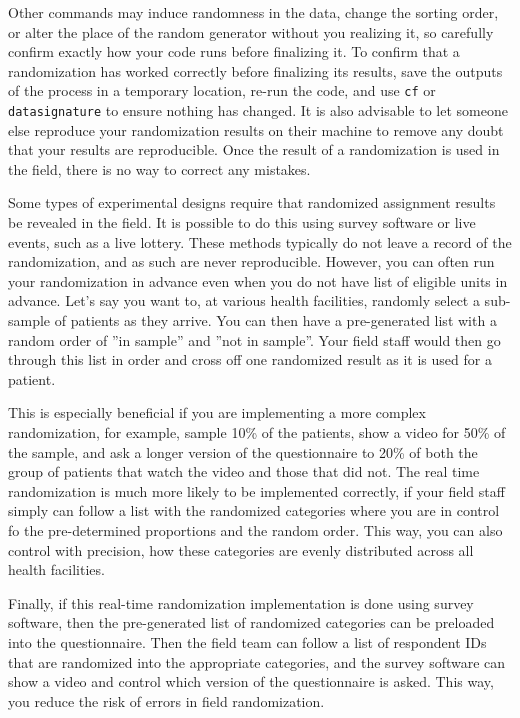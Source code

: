 Other commands may induce randomness in the data,
change the sorting order,
or alter the place of the random generator without you realizing it,
so carefully confirm exactly how your code runs before finalizing it.
To confirm that a randomization has worked correctly before finalizing its results,
save the outputs of the process in a temporary location,
re-run the code, and use \texttt{cf} or \texttt{datasignature} to ensure
nothing has changed. It is also advisable to let someone else reproduce your
randomization results on their machine to remove any doubt that your results
are reproducible.
Once the result of a randomization is used in the field,
there is no way to correct any mistakes.


Some types of experimental designs require
that randomized assignment results be revealed in the field.
It is possible to do this using survey software or live events, such as a live lottery.
These methods typically do not leave a record of the randomization,
and as such are never reproducible.
However, you can often run your randomization in advance
even when you do not have list of eligible units in advance.
Let's say you want to, at various health facilities,
randomly select a sub-sample of patients as they arrive.
You can then have a pre-generated list
with a random order of ''in sample'' and ''not in sample''.
Your field staff would then go through this list in order
and cross off one randomized result as it is used for a patient.

This is especially beneficial if you are implementing a more complex randomization,
for example, sample 10\% of the patients, show a video for 50\% of the sample,
and ask a longer version of the questionnaire to 20\% of both
the group of patients that watch the video and those that did not.
The real time randomization is much more likely to be implemented correctly,
if your field staff simply can follow a list with the randomized categories
where you are in control fo the pre-determined proportions and the random order.
This way, you can also control with precision,
how these categories are evenly distributed across all health facilities.

Finally, if this real-time randomization implementation is done using survey software,
then the pre-generated list of randomized categories can be preloaded
into the questionnaire.
Then the field team can follow a list of respondent IDs
that are randomized into the appropriate categories,
and the survey software can show a video and control which version of the questionnaire is asked.
This way, you reduce the risk of errors in field randomization.


